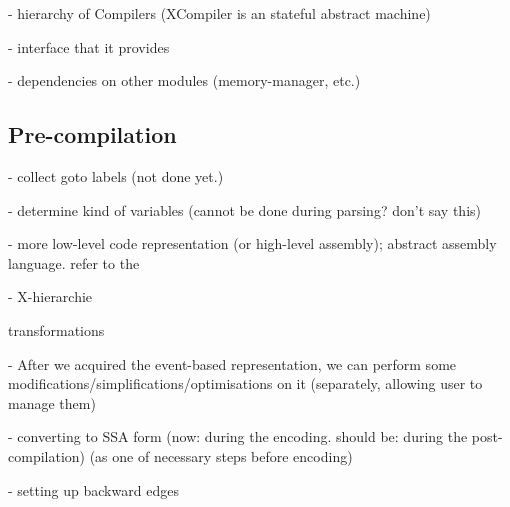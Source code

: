 





- hierarchy of Compilers (XCompiler is an stateful abstract machine)

- interface that it provides

- dependencies on other modules (memory-manager, etc.)


\subsection{Pre-compilation}
\label{ch:impl:y2x:precomp}

- collect goto labels (not done yet.)

- determine kind of variables (cannot be done during parsing? don't say this)




- more low-level code representation (or high-level assembly); abstract assembly language. refer to the %

- X-hierarchie



transformations

- After we acquired the event-based representation, we can perform some modifications/simplifications/optimisations on it (separately, allowing user to manage them)

- converting to SSA form (now: during the encoding. should be: during the post-compilation) (as one of necessary steps before encoding)

- setting up backward edges

